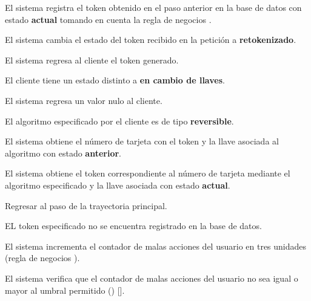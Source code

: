 {\begin{trayectoriaPrincipal}
    \item El sistema registra el token obtenido en el paso anterior en la base
      de datos con estado \textbf{actual} tomando en cuenta la regla de negocios
      .

    \item El sistema cambia el estado del token recibido en la petición
      a \textbf{retokenizado}.

    \item [regreso_token] El sistema regresa al cliente el token generado.

  \end{trayectoriaPrincipal}

  \begin{trayectoriaAlternativa}
    {El cliente tiene un estado distinto a \textbf{en cambio de llaves}.}

    \item El sistema regresa un valor nulo al cliente.

  \end{trayectoriaAlternativa}

  \begin{trayectoriaAlternativa}
    {El algoritmo especificado por el cliente es de tipo \textbf{reversible}.}

    \item El sistema obtiene el número de tarjeta con el token y la llave
      asociada al algoritmo con estado \textbf{anterior}.

    \item El sistema obtiene el token correspondiente al número de tarjeta
      mediante el algoritmo especificado y la llave asociada con estado
      \textbf{actual}.

    \item Regresar al paso  de la trayectoria
      principal.

  \end{trayectoriaAlternativa}

  \begin{trayectoriaAlternativa}
    {EL token especificado no se encuentra registrado en la base de datos.}

    \item El sistema incrementa el contador de malas acciones del usuario
      en tres unidades (regla de negocios
      ).
    \item El sistema verifica que el contador de malas acciones del usuario no
      sea igual o mayor al umbral permitido
      ()
      [].


\end{trayectoriaAlternativa}}
